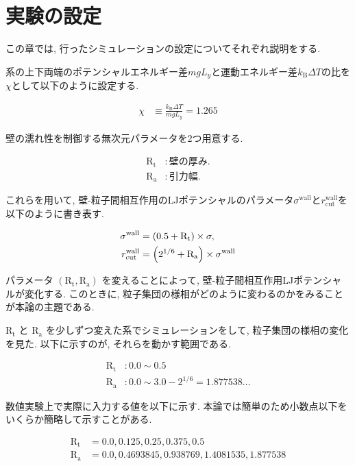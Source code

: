 \chapter{実験の設定}\label{sec:simulation}

この章では, 行ったシミュレーションの設定についてそれぞれ説明をする.

系の上下両端のポテンシャルエネルギー差$mgL_y$と運動エネルギー差$k_{\text{B}}\Delta T$の比を$\chi$として以下のように設定する.

\begin{align}
  \chi &\equiv \frac{k_{\text{B}}\Delta T}{mgL_{y}} = 1.265
\end{align}

壁の濡れ性を制御する無次元パラメータを2つ用意する.

\begin{align}
  \text{R}_\text{t} &: 壁の厚み. \\
  \text{R}_\text{a} &: 引力幅.
\end{align}

これらを用いて, 壁-粒子間相互作用のLJポテンシャルのパラメータ$\sigma^{\text{wall}}$と$r^{\text{wall}}_{\text{cut}}$を以下のように書き表す.

\begin{align}
  \sigma^{\text{wall}} &= \qty(0.5 + \text{R}_\text{t}) \times \sigma , \\
  r^{\text{wall}}_{\text{cut}} &= \qty(2^{1/6} + \text{R}_\text{a}) \times \sigma^{\text{wall}} 
\end{align}

パラメータ $(\text{R}_\text{t}, \text{R}_\text{a})$ を変えることによって, 壁-粒子間相互作用LJポテンシャルが変化する. このときに, 粒子集団の様相がどのように変わるのかをみることが本論の主題である.

$\text{R}_\text{t}$ と $\text{R}_\text{a}$ を少しずつ変えた系でシミュレーションをして, 粒子集団の様相の変化を見た. 以下に示すのが, それらを動かす範囲である.

\begin{align}
  \text{R}_\text{t} &\colon 0.0 \sim 0.5 \\
  \text{R}_\text{a} &\colon 0.0 \sim 3.0 - 2^{1/6} = 1.877538\dots
\end{align}

数値実験上で実際に入力する値を以下に示す. 本論では簡単のため小数点以下をいくらか簡略して示すことがある.

\begin{align}
  \text{R}_\text{t} &= 0.0,  0.125,  0.25,  0.375,  0.5 \\
  \text{R}_\text{a} &= 0.0,  0.4693845,  0.938769,  1.4081535,  1.877538
\end{align}

